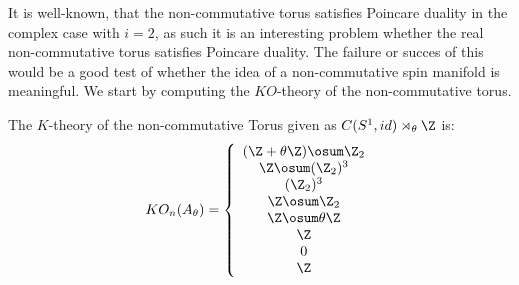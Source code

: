 It is well-known, \cite{connes2} that the non-commutative torus satisfies Poincare duality in the complex case with $i=2$, as such it is an interesting problem whether the real non-commutative torus satisfies Poincare duality. The failure or succes of this would be a good test of whether the idea of a non-commutative spin manifold is meaningful. We start by computing the $KO$-theory of the non-commutative torus. 
\begin{proposition}
The $K$-theory of the non-commutative Torus given as $C(S^1,id)\rtimes_{\theta} \Z$ is: 
\begin{align*}
	KO_n(A_\theta)=\left \{ \begin{array}{c} (\Z+\theta\Z)\osum \Z_2 \\ \Z\osum (\Z_2)^3 \\ (\Z_2)^3 \\ \Z\osum \Z_2 \\ \Z\osum \theta \Z  \\ \Z \\ 0 \\ \Z \end{array} \right .
\end{align*}
\end{proposition}
\begin{comment}
\begin{proof}
	As we are presently only interested in the $K$-theory classes as abstract groups, we may start by considering the case where the action is trivial. In this case the crossed product reduces to the tensor product $C(S^1,\tau)\tens C^*(\Z)$. Letting $a$ be the generator of $\Z$, we see that we may define the $^*$-isomorphism $a^n \to (z\mapsto z^n)$ so that $C^*(\Z)\cong C(S^1,\tau)$. Thus we get $A_0=C(S_1,id)\rtimes_0 \Z\cong C(S^1,id)\tens C(S^1,\tau_0)$. We may calculate the $K$-theory of this tensor product via. \Cref{ktheorys1} to get the desired table. The $K$-theory groups are independent of the choice of parameter as the group structure of $KO_*(A_\theta)$ depends continuously on $\theta$, showing the desired. 
\end{proof}
\end{comment}

